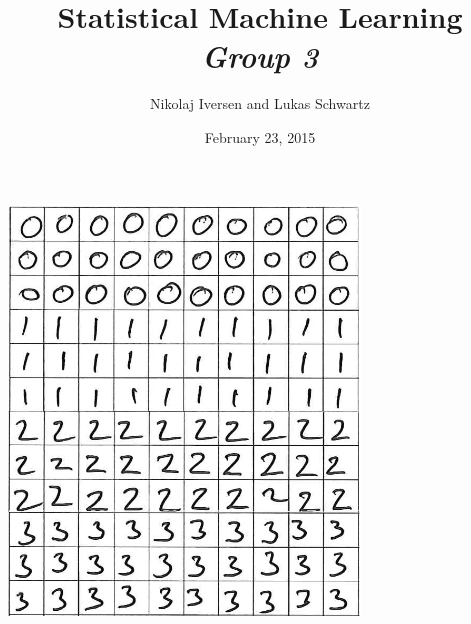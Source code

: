 \documentclass[12pt,a4paper]{article}
\begin{document}
\title{Statistical Machine Learning\\{\large\emph{Group 3}}}
\author{Nikolaj Iversen and Lukas Schwartz}
\date{February 23, 2015}
\maketitle

\vfill
\begin{center}
\includegraphics[width=0.7\textwidth]{graphics/digit_example}
\end{center}

\newpage

\tableofcontents
\listoffigures
\listoftables

\newpage


%


\end{document}
